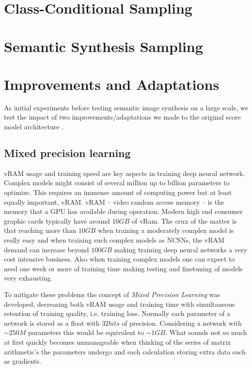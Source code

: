 

\section{Class-Conditional Sampling} %
\section{Semantic Synthesis Sampling} %
\section{Improvements and Adaptations}
As initial experiments before testing semantic image synthesis on a large scale, we test the impact of two improvements/adaptations we made to the original score model architecture \cite{score_3}.
\subsection{Mixed precision learning} %
vRAM usage and training speed are key aspects in training deep neural network. Complex models might consist of several million up to billion parameters to optimize. This requires an immense amount of computing power but at least equally important, vRAM. vRAM – video random access memory – is the memory that a GPU has available during operation. Modern high end consumer graphic cards typically have around $10GB$ of vRam. The crux of the matter is that reaching more than $10GB$ when training a moderately complex model is really easy and when training such complex models as NCSNs, the vRAM demand can increase beyond $100GB$ making training deep neural networks a very cost intensive business. Also when training complex models one can expect to need one week or more of training time making testing and finetuning of models very exhausting.

To mitigate these problems the concept of \textit{Mixed Precision Learning} \cite{mixed_prec} was developed, decreasing both vRAM usage and training time with simultaneous retention of training quality, i.e. training loss. Normally each parameter of a network is stored as a float with $32bits$ of precision. Considering a network with $\sim250M$ parameters this would be equivalent to $\sim1GB$. What sounds not so much at first quickly becomes unmanageable when thinking of the series of matrix arithmetic's the parameters undergo and each calculation storing extra data such as gradients. 


